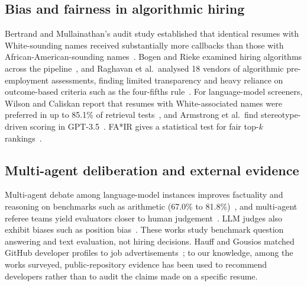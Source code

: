 \documentclass[conference]{IEEEtran}
\begin{document}
\subsection{Bias and fairness in algorithmic hiring}
Bertrand and Mullainathan's audit study established that identical resumes with White-sounding names received substantially more callbacks than those with African-American-sounding names~\cite{bertrand}. Bogen and Rieke examined hiring algorithms across the pipeline~\cite{bogen}, and Raghavan et al.\ analysed 18 vendors of algorithmic pre-employment assessments, finding limited transparency and heavy reliance on outcome-based criteria such as the four-fifths rule~\cite{raghavan}. For language-model screeners, Wilson and Caliskan report that resumes with White-associated names were preferred in up to 85.1\% of retrieval tests~\cite{wilson}, and Armstrong et al.\ find stereotype-driven scoring in GPT-3.5~\cite{armstrong}. FA*IR gives a statistical test for fair top-$k$ rankings~\cite{fair}.

\subsection{Multi-agent deliberation and external evidence}
Multi-agent debate among language-model instances improves factuality and reasoning on benchmarks such as arithmetic (67.0\% to 81.8\%)~\cite{du}, and multi-agent referee teams yield evaluators closer to human judgement~\cite{chateval}. LLM judges also exhibit biases such as position bias~\cite{zheng}. These works study benchmark question answering and text evaluation, not hiring decisions. Hauff and Gousios matched GitHub developer profiles to job advertisements~\cite{hauff}; to our knowledge, among the works surveyed, public-repository evidence has been used to recommend developers rather than to audit the claims made on a specific resume.
\end{document}
